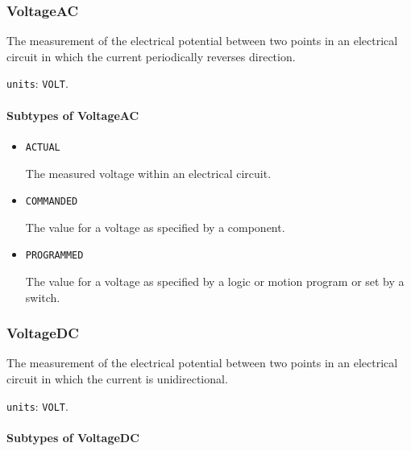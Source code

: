 \subsubsection{VoltageAC}
\label{sec:VoltageAC}



The measurement of the electrical potential between two points in an electrical circuit in which the current periodically reverses direction.


\texttt{units}: \texttt{VOLT}.

\paragraph{Subtypes of VoltageAC}\mbox{}
\label{sec:Subtypes of VoltageAC}

\begin{itemize}

\item \texttt{ACTUAL}


The measured voltage within an electrical circuit.

\item \texttt{COMMANDED}


The value for a voltage as specified by a  component.

\item \texttt{PROGRAMMED}


The value for a voltage as specified by a logic or motion program or set by a switch.


\end{itemize}






\subsubsection{VoltageDC}
\label{sec:VoltageDC}



The measurement of the electrical potential between two points in an electrical circuit in which the current is unidirectional.


\texttt{units}: \texttt{VOLT}.

\paragraph{Subtypes of VoltageDC}\mbox{}
\label{sec:Subtypes of VoltageDC}

